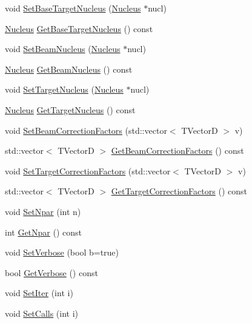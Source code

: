 \begin{DoxyCompactItemize}
void \hyperlink{classCoulExSimMinFCN_a5d994181f46bc33a9fdefa276c2509b3}{Set\-Base\-Target\-Nucleus} (\hyperlink{classNucleus}{Nucleus} $\ast$nucl)
\item 
\hyperlink{classNucleus}{Nucleus} \hyperlink{classCoulExSimMinFCN_a400ad2f74a60a4cc3e5e55e6f336721f}{Get\-Base\-Target\-Nucleus} () const 
\item 
void \hyperlink{classCoulExSimMinFCN_a95e28ca91e23afe1b0c4d8e2f57125cf}{Set\-Beam\-Nucleus} (\hyperlink{classNucleus}{Nucleus} $\ast$nucl)
\item 
\hyperlink{classNucleus}{Nucleus} \hyperlink{classCoulExSimMinFCN_a9527881e781a828fca6dd8362284548a}{Get\-Beam\-Nucleus} () const 
\item 
void \hyperlink{classCoulExSimMinFCN_a5e3af68fd0147c9bfa96382865d12bf9}{Set\-Target\-Nucleus} (\hyperlink{classNucleus}{Nucleus} $\ast$nucl)
\item 
\hyperlink{classNucleus}{Nucleus} \hyperlink{classCoulExSimMinFCN_aa25534be226b28ab3152f29894e6937d}{Get\-Target\-Nucleus} () const 
\item 
void \hyperlink{classCoulExSimMinFCN_a92ab3ca942b0d911ddc88357a64aacc6}{Set\-Beam\-Correction\-Factors} (std\-::vector$<$ T\-Vector\-D $>$ v)
\item 
std\-::vector$<$ T\-Vector\-D $>$ \hyperlink{classCoulExSimMinFCN_ac0f210f5b6f5084e8fdc9287c1d5dc55}{Get\-Beam\-Correction\-Factors} () const 
\item 
void \hyperlink{classCoulExSimMinFCN_ae32103827c4ee6c09095ce2906bf138b}{Set\-Target\-Correction\-Factors} (std\-::vector$<$ T\-Vector\-D $>$ v)
\item 
std\-::vector$<$ T\-Vector\-D $>$ \hyperlink{classCoulExSimMinFCN_afc423c36060089661594cc7e6aed8c83}{Get\-Target\-Correction\-Factors} () const 
\item 
void \hyperlink{classCoulExSimMinFCN_aee050c5a88acb9f507365a7143c07253}{Set\-Npar} (int n)
\item 
int \hyperlink{classCoulExSimMinFCN_a9bcb5e4c7fe91e790a8fbd0e976519b3}{Get\-Npar} () const 
\item 
void \hyperlink{classCoulExSimMinFCN_a19ceaaa3e8f72055d977d9e72ea5f2bd}{Set\-Verbose} (bool b=true)
\item 
bool \hyperlink{classCoulExSimMinFCN_a6c49273f2ca24b024044ce0ca6bf3349}{Get\-Verbose} () const 
\item 
void \hyperlink{classCoulExSimMinFCN_a0d1239e0f051c6b5e20ce96437c1bcf4}{Set\-Iter} (int i)
\item 
void \hyperlink{classCoulExSimMinFCN_a39ea44fd91f63d14dfd5b07c0d5b20c5}{Set\-Calls} (int i)

\end{DoxyCompactItemize}
